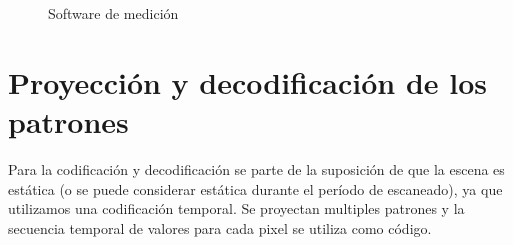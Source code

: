 \begin{figure}[!bth]
    \myfloatalign
        \caption{Software de medición}
        \label{fig:scannerSoft_mainWindow}
\end{figure}


\section{Proyección y decodificación de los patrones}
Para la codificación y decodificación se parte de la suposición de que la escena es estática (o se puede considerar estática durante el período de escaneado), ya que utilizamos una codificación temporal. Se proyectan multiples patrones y la secuencia temporal de valores para cada pixel se utiliza como código.

